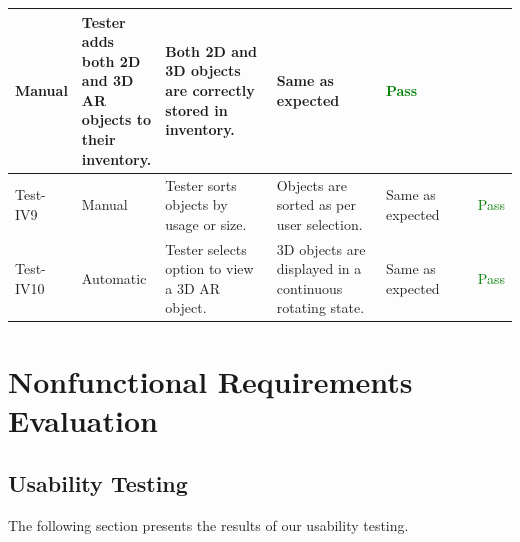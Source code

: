 \documentclass[12pt, titlepage]{article}
\begin{document}
\begin{table}[H]
{\begin{tabular}{|l|p{0.15\linewidth}|p{0.3\linewidth}|p{0.3\linewidth}|p{0.3\linewidth}|p{0.1\linewidth}|}
      Manual & 
      Tester adds both 2D and 3D AR objects to their inventory. &
      Both 2D and 3D objects are correctly stored in inventory. & 
      Same as expected & 
      \textcolor{Green}{Pass} \\
      \hline
      Test-IV9 & 
      Manual & 
      Tester sorts objects by usage or size. &
      Objects are sorted as per user selection. & 
      Same as expected & 
      \textcolor{Green}{Pass} \\
      \hline
      Test-IV10 & 
      Automatic & 
      Tester selects option to view a 3D AR object. &
      3D objects are displayed in a continuous rotating state. & 
      Same as expected & 
      \textcolor{Green}{Pass} \\
      \hline
    \end{tabular}}
  \label{table:Inventory_Tests}
\end{table}

\restoregeometry
\section{Nonfunctional Requirements Evaluation}

\subsection{Usability Testing}
The following section presents the results of our usability testing.

\begin{table}[H]
  \caption{\bf Usability Testing Evaluation Results}
  \label{table:GR-Usability}
\end{table}
\end{document}
